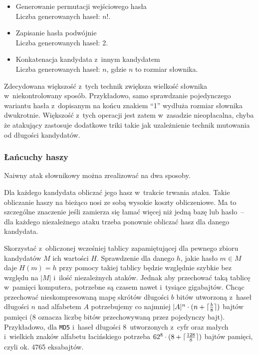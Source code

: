 \begin{itemize}
    \item
        Generowanie permutacji wejściowego hasła \\
        Liczba generowanych haseł: $n!$.

    \item
        Zapisanie hasła podwójnie \\
        Liczba generowanych haseł: 2.

    \item
        Konkatenacja kandydata z~innym kandydatem \\
        Liczba generowanych haseł: $n$, gdzie $n$ to rozmiar słownika.

\end{itemize}

Zdecydowana większość z~tych technik zwiększa wielkość słownika
w~niekontrolowany sposób. Przykładowo, samo sprawdzanie pojedynczego wariantu
hasła z~dopisanym na końcu znakiem ``1'' wydłuża rozmiar słownika dwukrotnie.
Większość z~tych operacji jest zatem w~zasadzie nieopłacalna, chyba że
atakujący zastosuje dodatkowe triki takie jak uzależnienie technik mutowania od
długości kandydatów.



\subsubsection{Łańcuchy haszy}
Naiwny atak słownikowy można zrealizować na dwa sposoby.

\begin{myenumerate}

    \item Dla każdego kandydata obliczać jego hasz w~trakcie trwania ataku.
    Takie obliczanie haszy na bieżąco nosi ze sobą wysokie koszty obliczeniowe.
    Ma to szczególne znaczenie jeśli zamierza się łamać więcej niż jedną bazę
    lub hasło~-- dla każdego niezależnego ataku trzeba ponownie obliczać hasz
    dla danego kandydata.

    \item Skorzystać z~obliczonej wcześniej tablicy zapamiętującej dla pewnego
    zbioru kandydatów $M$ ich wartości $H$. Sprawdzenie dla danego $h$, jakie
    hasło $m \in M$ daje $H(m) = h$ przy pomocy takiej tablicy będzie względnie
    szybkie bez względu na $|M|$ i~ilość niezależnych ataków. Jednak aby
    przechować taką tablicę w~pamięci komputera, potrzebne są czasem nawet
    i~tysiące gigabajtów. Chcąc przechować nieskompresowaną mapę skrótów
    długości $b$ bitów utworzoną z~haseł długości $n$ nad alfabetem $A$
    potrzebujemy co najmniej $|A|^n \cdot (n + \lceil\frac{b}{8}\rceil)$ bajtów
    pamięci (8 oznacza liczbę bitów przechowywaną przez pojedynczy bajt).
    Przykładowo, dla \texttt{MD5} i~haseł długości 8~utworzonych z~cyfr oraz
    małych i~wielkich znaków alfabetu łacińskiego potrzeba $62^8 \cdot (8 +
    \lceil\frac{128}{8}\rceil)$ bajtów pamięci, czyli ok. 4765 eksabajtów.

\end{myenumerate}

